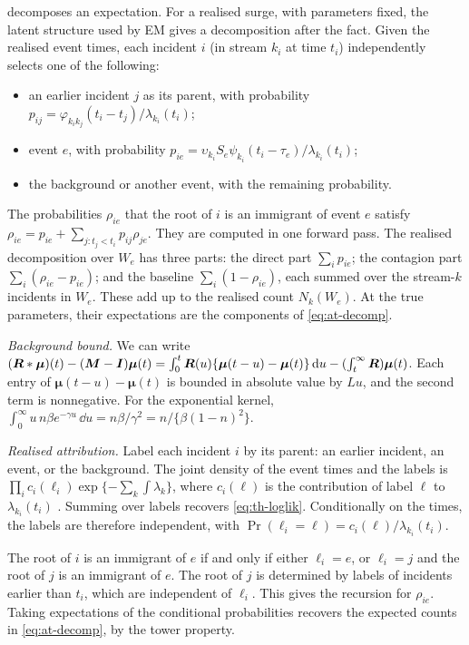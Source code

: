 \begin{remark}\label{rem:at-expost}
 decomposes an expectation. For a realised surge, with parameters
fixed, the latent structure used by EM \citep{veen2008,marsan2008,mohler2011} gives a
decomposition after the fact. Given the realised event times, each incident $i$ (in
stream $k_i$ at time $t_i$) independently selects one of the following:
\begin{itemize}
  \item an earlier incident $j$ as its parent, with probability
  $p_{ij}=\varphi_{k_ik_j}(t_i-t_j)/\lambda_{k_i}(t_i)$;
  \item event $e$, with probability $p_{ie}=\upsilon_{k_i}S_e\psi_{k_i}(t_i-\tau_e)/\lambda_{k_i}(t_i)$;
  \item the background or another event, with the remaining probability.
\end{itemize}
The probabilities $\rho_{ie}$ that the root of $i$ is an immigrant of event $e$ satisfy
$\rho_{ie}=p_{ie}+\sum_{j:t_j<t_i}p_{ij}\rho_{je}$. They are computed in one forward
pass. The realised decomposition over $W_e$ has three parts: the direct part
$\sum_{i}p_{ie}$; the contagion part $\sum_{i}(\rho_{ie}-p_{ie})$; and the baseline
$\sum_{i}(1-\rho_{ie})$, each summed over the stream-$k$ incidents in $W_e$. These add up
to the realised count $N_k(W_e)$. At the true parameters, their expectations are the
components of \eqref{eq:at-decomp}.
\end{remark}

\emph{Background bound.} We can write
$(\bm{R}*\bm\mu)(t)-(\bm{M}-\bm{I})\bm\mu(t)=\int_0^t\bm{R}(u)\{\bm\mu(t-u)-\bm\mu(t)\}\,\mathrm{d} u-(\int_t^\infty\bm{R})\bm\mu(t)$.
Each entry of $\bm\mu(t-u)-\bm\mu(t)$ is bounded in absolute value by $Lu$, and the
second term is nonnegative. For the exponential kernel,
$\int_0^\infty u\,n\beta e^{-\gamma u}\,\dd u=n\beta/\gamma^2=n/\{\beta(1-n)^2\}$.

\emph{Realised attribution.} Label each incident $i$ by its parent: an earlier
incident, an event, or the background. The joint density of the event times and the
labels is $\prod_ic_i(\ell_i)\exp\{-\sum_k\int\lambda_k\}$, where $c_i(\ell)$ is the
contribution of label $\ell$ to $\lambda_{k_i}(t_i)$
\citep{veen2008}. Summing over labels recovers \eqref{eq:th-loglik}. Conditionally on
the times, the labels are therefore independent, with
$\Pr(\ell_i=\ell)=c_i(\ell)/\lambda_{k_i}(t_i)$.

The root of $i$ is an immigrant of $e$ if and only if either $\ell_i=e$, or $\ell_i=j$
and the root of $j$ is an immigrant of $e$. The root of $j$ is determined by labels of
incidents earlier than $t_i$, which are independent of $\ell_i$. This gives the
recursion for $\rho_{ie}$. Taking expectations of the conditional probabilities
recovers the expected counts in \eqref{eq:at-decomp}, by the tower property.

